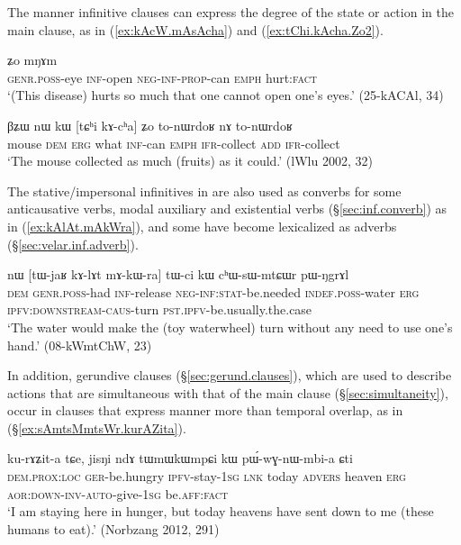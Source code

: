 The manner infinitive clauses can express the degree of the state or action in the main clause, as in (\ref{ex:kAcW.mAsAcha}) and (\ref{ex:tChi.kAcha.Zo2}). 

\begin{exe}
\ex \label{ex:kAcW.mAsAcha}
 ʑo mŋɤm  \\
\textsc{genr}.\textsc{poss}-eye \textsc{inf}-open \textsc{neg}-\textsc{inf}-\textsc{prop}-can \textsc{emph} hurt:\textsc{fact} \\
\glt `(This disease) hurts so much that one cannot open one's eyes.' (25-kACAl, 34)
\end{exe}

\begin{exe}
\ex \label{ex:tChi.kAcha.Zo2}
\gll βʑɯ nɯ kɯ [tɕʰi kɤ-cʰa] ʑo to-nɯrdoʁ nɤ to-nɯrdoʁ \\
mouse \textsc{dem} \textsc{erg} what \textsc{inf}-can \textsc{emph} \textsc{ifr}-collect \textsc{add} \textsc{ifr}-collect \\
\glt `The mouse collected as much (fruits) as it could.' (lWlu 2002, 32)
\end{exe}


The stative/impersonal infinitives in  are also used as converbs for some anticausative verbs, modal auxiliary and existential verbs (§\ref{sec:inf.converb}) as in (\ref{ex:kAlAt.mAkWra}), and some have become lexicalized as adverbs (§\ref{sec:velar.inf.adverb}).

\begin{exe}
\ex \label{ex:kAlAt.mAkWra}
\gll nɯ [tɯ-jaʁ kɤ-lɤt mɤ-kɯ-ra] tɯ-ci kɯ cʰɯ-sɯ-mtɕɯr pɯ-ŋgrɤl \\
\textsc{dem} \textsc{genr}.\textsc{poss}-had \textsc{inf}-release \textsc{neg}-\textsc{inf}:\textsc{stat}-be.needed \textsc{indef}.\textsc{poss}-water \textsc{erg} \textsc{ipfv}:\textsc{downstream}-\textsc{caus}-turn \textsc{pst}.\textsc{ipfv}-be.usually.the.case \\
\glt `The water would make the (toy waterwheel) turn without any need to use one's hand.' (08-kWmtChW, 23)
\end{exe}

In addition, gerundive clauses (§\ref{sec:gerund.clauses}), which are used to describe actions that are simultaneous with that of the main clause (§\ref{sec:simultaneity}), occur in clauses that express manner more than temporal overlap, as in (§\ref{ex:sAmtsMmtsWr.kurAZita}).

\begin{exe}
\ex \label{ex:sAmtsMmtsWr.kurAZita}
 ku-rɤʑit-a tɕe, jisŋi ndɤ tɯmɯkɯmpɕi kɯ pɯ́-wɣ-nɯ-mbi-a ɕti  \\
\textsc{dem}.\textsc{prox}:\textsc{loc} \textsc{ger}-be.hungry \textsc{ipfv}-stay-\textsc{1sg} \textsc{lnk} today \textsc{advers} heaven \textsc{erg} \textsc{aor}:\textsc{down}-\textsc{inv}-\textsc{auto}-give-\textsc{1sg} be.\textsc{aff}:\textsc{fact} \\
\glt `I am staying here in hunger, but today heavens have sent down to me (these humans to eat).' (Norbzang 2012, 291)
\end{exe}

